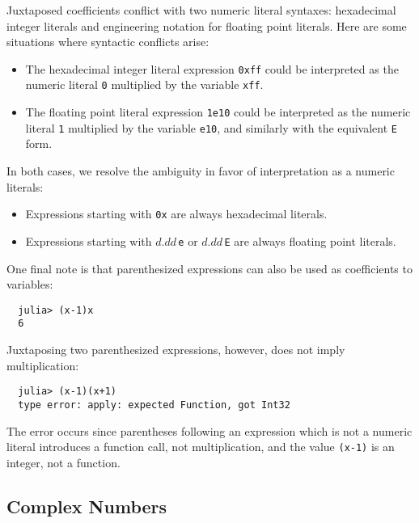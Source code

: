 \documentclass{article}
\begin{document}
Juxtaposed coefficients conflict with two numeric literal syntaxes:
hexadecimal integer literals and engineering notation for floating point literals.
Here are some situations where syntactic conflicts arise:
\begin{itemize}
\item The hexadecimal integer literal expression \verb|0xff| could be interpreted as the numeric literal \verb|0| multiplied by the variable \verb|xff|.
\item The floating point literal expression \verb|1e10| could be interpreted as the numeric literal \verb|1| multiplied by the variable \verb|e10|, and similarly with the equivalent \verb|E| form.
\end{itemize}
In both cases, we resolve the ambiguity in favor of interpretation as a numeric literals:
\begin{itemize}
\item Expressions starting with \verb|0x| are always hexadecimal literals.
\item Expressions starting with $d.dd$\,\verb|e| or $d.dd$\,\verb|E| are always floating point literals.
\end{itemize}
One final note is that parenthesized expressions can also be used as coefficients to variables:
\begin{verbatim}
  julia> (x-1)x
  6
\end{verbatim}
Juxtaposing two parenthesized expressions, however, does not imply multiplication:
\begin{verbatim}
  julia> (x-1)(x+1)
  type error: apply: expected Function, got Int32
\end{verbatim}
The error occurs since parentheses following an expression which is not a numeric literal introduces a function call, not multiplication, and the value \verb|(x-1)| is an integer, not a function.

\subsection{Complex Numbers}
\end{document}
